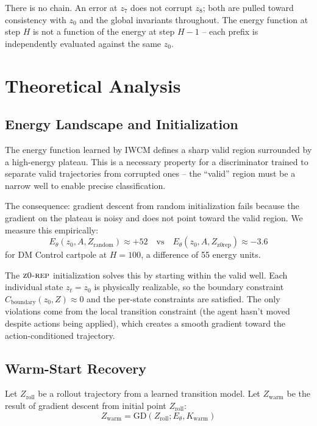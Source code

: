 \documentclass[12pt]{article}
\newcommand{\zrep}{\textsc{z0-rep}}
\begin{document}
There is no chain. An error at $z_7$ does not corrupt $z_8$; both are pulled toward consistency with $z_0$ and the global invariants throughout. The energy function at step $H$ is not a function of the energy at step $H-1$ -- each prefix is independently evaluated against the same $z_0$.

\section{Theoretical Analysis}
\label{sec:theory}

\subsection{Energy Landscape and Initialization}

The energy function learned by IWCM defines a sharp valid region surrounded by a high-energy plateau. This is a necessary property for a discriminator trained to separate valid trajectories from corrupted ones -- the ``valid'' region must be a narrow well to enable precise classification.

The consequence: gradient descent from random initialization fails because the gradient on the plateau is noisy and does not point toward the valid region. We measure this empirically:
\[
  E_\theta(z_0, A, Z_\text{random}) \approx +52 \quad \text{vs} \quad
  E_\theta(z_0, A, Z_\text{z0rep}) \approx -3.6
\]
for DM Control cartpole at $H=100$, a difference of 55 energy units.

The $\zrep$ initialization solves this by starting within the valid well. Each individual state $z_t = z_0$ is physically realizable, so the boundary constraint $C_\text{boundary}(z_0, Z) \approx 0$ and the per-state constraints are satisfied. The only violations come from the local transition constraint (the agent hasn't moved despite actions being applied), which creates a smooth gradient toward the action-conditioned trajectory.

\subsection{Warm-Start Recovery}

Let $Z_\text{roll}$ be a rollout trajectory from a learned transition model. Let $Z_\text{warm}$ be the result of gradient descent from initial point $Z_\text{roll}$:
\[
  Z_\text{warm} = \text{GD}(Z_\text{roll}; E_\theta, K_\text{warm})
\]
\end{document}
